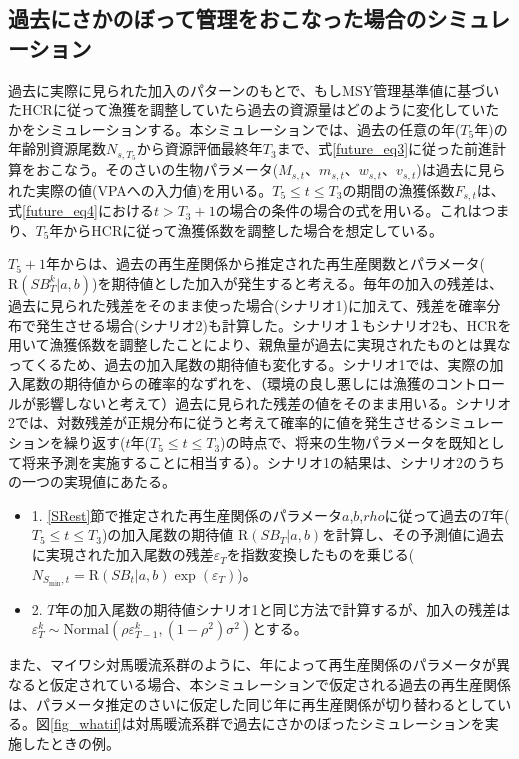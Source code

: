 \documentclass[11pt]{jsarticle}
\begin{document}
\subsection{過去にさかのぼって管理をおこなった場合のシミュレーション\label{sec:whatif}}

過去に実際に見られた加入のパターンのもとで、もしMSY管理基準値に基づいたHCRに従って漁獲を調整していたら過去の資源量はどのように変化していたかをシミュレーションする。本シミュレーションでは、過去の任意の年($T_5$年)の年齢別資源尾数$N_{s,T_5}$から資源評価最終年$T_3$まで、式\ref{future_eq3}に従った前進計算をおこなう。そのさいの生物パラメータ($M_{s,t}$、$m_{s,t}$、$w_{s,t}$、$v_{s,t}$)は過去に見られた実際の値(VPAへの入力値)を用いる。$T_5 \leq t \leq T_3$の期間の漁獲係数$F_{s,t}$は、式\ref{future_eq4}における$t > T_3+1$の場合の条件の場合の式を用いる。これはつまり、$T_5$年からHCRに従って漁獲係数を調整した場合を想定している。

$T_5+1$年からは、過去の再生産関係から推定された再生産関数とパラメータ($\mathrm{R}(S\!B_{T}^k|a,b)$)を期待値とした加入が発生すると考える。毎年の加入の残差は、過去に見られた残差をそのまま使った場合(シナリオ1)に加えて、残差を確率分布で発生させる場合(シナリオ2)も計算した。シナリオ１もシナリオ2も、HCRを用いて漁獲係数を調整したことにより、親魚量が過去に実現されたものとは異なってくるため、過去の加入尾数の期待値も変化する。シナリオ1では、実際の加入尾数の期待値からの確率的なずれを、（環境の良し悪しには漁獲のコントロールが影響しないと考えて）過去に見られた残差の値をそのまま用いる。シナリオ2では、対数残差が正規分布に従うと考えて確率的に値を発生させるシミュレーションを繰り返す($t$年($T_5 \leq t \leq T_3$)の時点で、将来の生物パラメータを既知として将来予測を実施することに相当する）。シナリオ1の結果は、シナリオ2のうちの一つの実現値にあたる。

\begin{itemize}
\item 1. \ref{SRest}節で推定された再生産関係のパラメータ$a$,$b$,$rho$に従って過去の$T$年($T_5 \leq t \leq T_3$)の加入尾数の期待値 $\mathrm{R}(S\!B_{T}|a,b)$を計算し、その予測値に過去に実現された加入尾数の残差$\varepsilon_{T}$を指数変換したものを乗じる($ N_{S_{\mathrm{min}},t} = \mathrm{R}(S\!B_{t}|a,b) \exp (\varepsilon_T)$)。
\item 2. $T$年の加入尾数の期待値シナリオ1と同じ方法で計算するが、加入の残差は$\varepsilon_{T}^k \sim \mathrm{Normal} (\rho \varepsilon_{T-1}^k,(1-\rho^2) \sigma^2)$とする。
\end{itemize}

また、マイワシ対馬暖流系群のように、年によって再生産関係のパラメータが異なると仮定されている場合、本シミュレーションで仮定される過去の再生産関係は、パラメータ推定のさいに仮定した同じ年に再生産関係が切り替わるとしている。図\ref{fig_whatif}は対馬暖流系群で過去にさかのぼったシミュレーションを実施したときの例。
\end{document}
